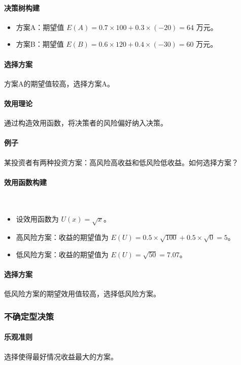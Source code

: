 \documentclass[UTF8]{ctexart}
\begin{document}
\paragraph{决策树构建}
\begin{itemize}
    \item 方案A：期望值 \( E(A) = 0.7 \times 100 + 0.3 \times (-20) = 64 \) 万元。
    \item 方案B：期望值 \( E(B) = 0.6 \times 120 + 0.4 \times (-30) = 60 \) 万元。
\end{itemize}
\paragraph{选择方案}
方案A的期望值较高，选择方案A。

\paragraph{效用理论}
通过构造效用函数，将决策者的风险偏好纳入决策。
\paragraph{例子}
某投资者有两种投资方案：高风险高收益和低风险低收益。如何选择方案？
\paragraph{效用函数构建}
\
\begin{itemize}
    \item 设效用函数为 \( U(x) = \sqrt{x} \)。
    \item 高风险方案：收益的期望值为 \( E(U) = 0.5 \times \sqrt{100} + 0.5 \times \sqrt{0} = 5 \)。
    \item 低风险方案：收益的期望值为 \( E(U) = \sqrt{50} = 7.07 \)。
\end{itemize}
\paragraph{选择方案}
低风险方案的期望效用值较高，选择低风险方案。



\subsubsection {不确定型决策}
\paragraph{乐观准则}
选择使得最好情况收益最大的方案。
\end{document}
